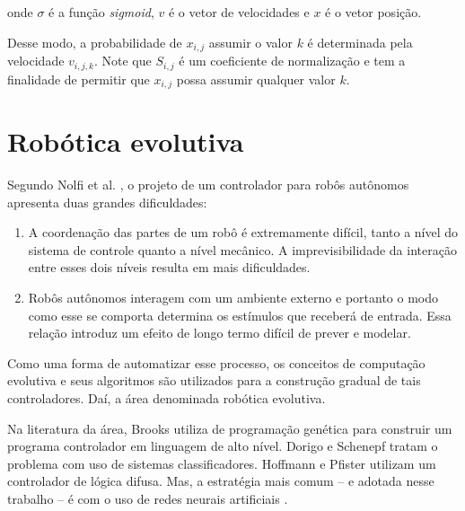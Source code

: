 onde $\sigma$ é a função \textit{sigmoid}, $v$ é o vetor de velocidades e $x$ é o vetor posição.

Desse modo, a probabilidade de $x_{i,j}$ assumir o valor $k$ é determinada pela velocidade $v_{i,j,k}$. Note que $S_{i,j}$ é um coeficiente de normalização e tem a finalidade de permitir que $x_{i,j}$ possa assumir qualquer valor $k$.


\section{Robótica evolutiva}
\label{sec:evolutionary-robotics}

Segundo Nolfi et al. \cite{nolfi1994howtoevolve}, o projeto de um controlador para robôs autônomos apresenta duas grandes dificuldades:

\begin{enumerate}
    \item A coordenação das partes de um robô é extremamente difícil, tanto a nível do sistema de controle quanto a nível mecânico. A imprevisibilidade da interação entre esses dois níveis resulta em mais dificuldades.
    \item Robôs autônomos interagem com um ambiente externo e portanto o modo como esse se comporta determina os estímulos que receberá de entrada. Essa relação introduz um efeito de longo termo difícil de prever e modelar.
\end{enumerate}

Como uma forma de automatizar esse processo, os conceitos de computação evolutiva e seus algoritmos são utilizados para a construção gradual de tais controladores. Daí, a área denominada robótica evolutiva.

Na literatura da área, Brooks \cite{brooks1992artificiallife} utiliza de programação genética para construir um programa controlador em linguagem de alto nível. Dorigo e Schenepf \cite{dorigo1993geneticsbased} tratam o problema com uso de sistemas classificadores. Hoffmann e Pfister \cite{hoffmann1996evolutionary} utilizam um controlador de lógica difusa. Mas, a estratégia mais comum -- e adotada nesse trabalho -- é com o uso de redes neurais artificiais \cite{cliff1992evolvingvisually} \cite{miglino1994selection} \cite{nolfi1994phenotypic}.

